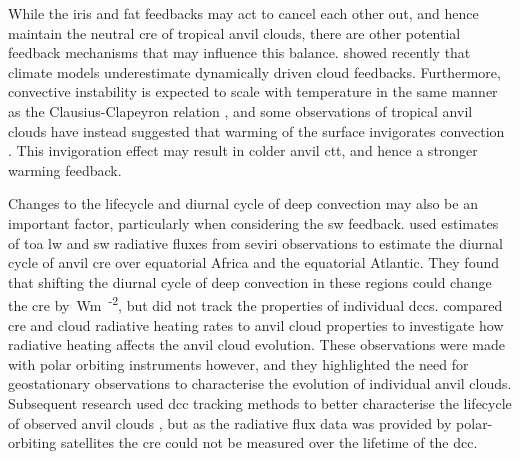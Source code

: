 While the iris and \acrshort{fat} feedbacks may act to cancel each other out, and hence maintain the neutral \acrshort{cre} of tropical anvil clouds, there are other potential feedback mechanisms that may influence this balance.
\citet{hill_climate_2023} showed recently that climate models underestimate dynamically driven cloud feedbacks.
Furthermore, convective instability is expected to scale with temperature in the same manner as the Clausius-Clapeyron relation \citep{seeley_why_2015, agard_clausius_2017}, and some observations of tropical anvil clouds have instead suggested that warming of the surface invigorates convection \citep{igel_cloudsat_2014}.
This invigoration effect may result in colder anvil \acrfull{ctt}, and hence a stronger warming feedback.

Changes to the lifecycle and diurnal cycle of deep convection may also be an important factor, particularly when considering the \acrshort{sw} feedback. 
\citet{nowicki_observations_2004} used estimates of \acrfull{toa} \acrshort{lw} and \acrshort{sw} radiative fluxes from \acrfull{seviri} observations to estimate the diurnal cycle of anvil \acrshort{cre} over equatorial Africa and the equatorial Atlantic. 
They found that shifting the diurnal cycle of deep convection in these regions could change the \acrshort{cre} by \,\unit{Wm\textsuperscript{-2}}, but did not track the properties of individual \acrshort{dcc}s.
\citet{bouniol_macrophysical_2016} compared \acrshort{cre} and cloud radiative heating rates to anvil cloud properties to investigate how radiative heating affects the anvil cloud evolution.
These observations were made with polar orbiting instruments however, and they highlighted the need for geostationary observations to characterise the evolution of individual anvil clouds.
Subsequent research used \acrshort{dcc} tracking methods to better characterise the lifecycle of observed anvil clouds \citep{bouniol_life_2021}, but as the radiative flux data was provided by polar-orbiting satellites the \acrshort{cre} could not be measured over the lifetime of the \acrshort{dcc}.



